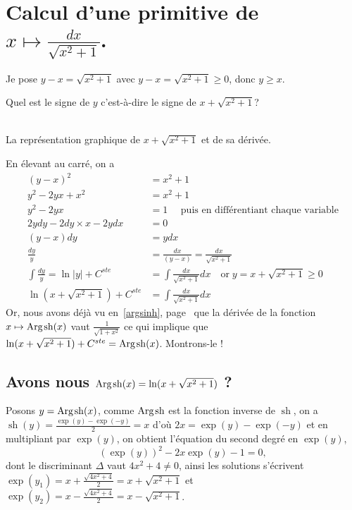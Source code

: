 \documentclass[a4paper,12pt]{report}
\renewcommand{\sinh}{\mathop{\mathrm{sh}}}
\renewcommand{\arg}{\mathop{\mathrm{Arg}}}
\begin{document}
\section{Calcul d'une primitive de $ x \longmapsto  \frac{dx}{\sqrt{x^2 + 1} } $. }


Je pose $y-x = \sqrt{x^2+1} $ avec $y - x = \sqrt{x^2 + 1} \geqslant 0 $, donc $y \geqslant  x$.

Quel est le signe de $y$ c'est-à-dire le signe de $x + \sqrt{x^2+1} $?

\begin{center}
 \\
La représentation graphique de $x + \sqrt{x^2+1}$ et de sa dérivée.
\end{center}



En élevant au carré, on a 
\begin{align*}
(y-x)^2 & = x^2 + 1 \\
y^2 - 2yx + x^2 & = x^2 + 1 \\
y^2 - 2yx  & = 1 \quad \textrm{ puis en différentiant chaque variable} \\
2ydy - 2dy \times x - 2ydx & = 0 \\
(y-x)dy & = ydx \\
\frac{dy}{y} & = \frac{dx}{(y-x)} = \frac{dx}{\sqrt{x^2+1} } \\
\int \frac{dy}{y} = \ln|y| + C^{ste} & = \int \frac{dx}{\sqrt{x^2+1} } dx \quad \textrm{or} \; y = x + \sqrt{x^2+1}  \geqslant 0 \\
\ln(x + \sqrt{x^2+1}) + C^{ste} & = \int \frac{dx}{\sqrt{x^2+1} } dx  
\end{align*}
Or, nous avons déjà vu en~\ref{argsinh}, page~\pageref{argsinh} que la dérivée de la fonction  $x \mapsto \arg\mspace{-1mu}\sinh(x)$  vaut $ \frac{1}{ \sqrt{1+x^2}}$ ce qui implique que $\ln(x + \sqrt{x^2+1}) + C^{ste} = \arg\mspace{-1mu}\sinh\nolimits(x) $. Montrons-le !

\subsection{Avons nous $\arg\mspace{-1mu}\sinh\nolimits(x) = \ln(x + \sqrt{x^2+1}) $ ?}

Posons $ y = \arg\mspace{-1mu}\sinh\nolimits(x) $, comme $ \arg\mspace{-1mu}\sinh\nolimits $ est la fonction inverse de $\sinh$, on a $\sinh(y) = \frac{\exp(y) - \exp(-y)}{2} = x$ d'où $2x = \exp(y) - \exp(-y) $ et en multipliant par $\exp(y)$, on obtient l'équation du second degré en $\exp(y)$,
\begin{equation}
\left(\exp(y) \right)^2 - 2x \exp(y) -1 = 0, 
\end{equation}
dont le discriminant $\Delta$ vaut $4x^2 + 4 \neq 0$, ainsi les solutions s'écrivent $ \exp(y_1) = x + \frac{\sqrt{4x^2 + 4}}{2} = x + \sqrt{x^2+1}$ et $ \exp(y_2) = x - \frac{\sqrt{4x^2 + 4}}{2} = x - \sqrt{x^2+1}$. 
\end{document}
